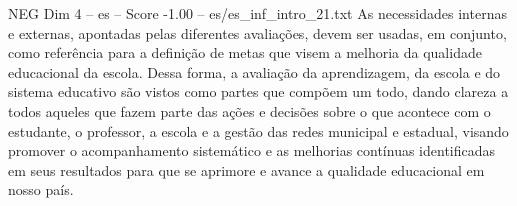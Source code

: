 \begin{textsample}{NEG Dim 4 – es – Score -1.00 – es/es\_inf\_intro\_21.txt}
As necessidades internas e externas, apontadas pelas diferentes avaliações, devem ser usadas, em conjunto, como referência para a definição de metas que visem a melhoria da qualidade educacional da escola.
Dessa forma, a avaliação da aprendizagem, da escola e do sistema educativo são vistos como partes que compõem um todo, dando clareza a todos aqueles que fazem parte das ações e decisões sobre o que acontece com o estudante, o professor, a escola e a gestão das redes municipal e estadual, visando promover o acompanhamento sistemático e as melhorias contínuas identificadas em seus resultados para que se aprimore e avance a qualidade educacional em nosso país.

\end{textsample}
